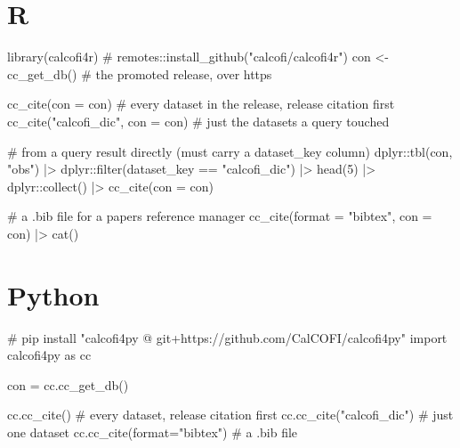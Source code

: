 \documentclass[
  letterpaper,
  DIV=11,
  numbers=noendperiod]{scrreprt}
\newenvironment{Shaded}{\begin{snugshade}}{\end{snugshade}}
\newcommand{\AttributeTok}[1]{\textcolor[rgb]{0.40,0.45,0.13}{#1}}
\newcommand{\BuiltInTok}[1]{\textcolor[rgb]{0.00,0.23,0.31}{#1}}
\newcommand{\CommentTok}[1]{\textcolor[rgb]{0.37,0.37,0.37}{#1}}
\newcommand{\DecValTok}[1]{\textcolor[rgb]{0.68,0.00,0.00}{#1}}
\newcommand{\FunctionTok}[1]{\textcolor[rgb]{0.28,0.35,0.67}{#1}}
\newcommand{\ImportTok}[1]{\textcolor[rgb]{0.00,0.46,0.62}{#1}}
\newcommand{\NormalTok}[1]{\textcolor[rgb]{0.00,0.23,0.31}{#1}}
\newcommand{\OperatorTok}[1]{\textcolor[rgb]{0.37,0.37,0.37}{#1}}
\newcommand{\OtherTok}[1]{\textcolor[rgb]{0.00,0.23,0.31}{#1}}
\newcommand{\SpecialCharTok}[1]{\textcolor[rgb]{0.37,0.37,0.37}{#1}}
\newcommand{\StringTok}[1]{\textcolor[rgb]{0.13,0.47,0.30}{#1}}
\begin{document}
\section{R}

\begin{Shaded}
\begin{Highlighting}[]
\FunctionTok{library}\NormalTok{(calcofi4r)                }\CommentTok{\# remotes::install\_github("calcofi/calcofi4r")}
\NormalTok{con }\OtherTok{\textless{}{-}} \FunctionTok{cc\_get\_db}\NormalTok{()                }\CommentTok{\# the promoted release, over https}

\FunctionTok{cc\_cite}\NormalTok{(}\AttributeTok{con =}\NormalTok{ con)                }\CommentTok{\# every dataset in the release, release citation first}
\FunctionTok{cc\_cite}\NormalTok{(}\StringTok{"calcofi\_dic"}\NormalTok{, }\AttributeTok{con =}\NormalTok{ con) }\CommentTok{\# just the datasets a query touched}

\CommentTok{\# from a query result directly (must carry a dataset\_key column)}
\NormalTok{dplyr}\SpecialCharTok{::}\FunctionTok{tbl}\NormalTok{(con, }\StringTok{"obs"}\NormalTok{) }\SpecialCharTok{|\textgreater{}}
\NormalTok{  dplyr}\SpecialCharTok{::}\FunctionTok{filter}\NormalTok{(dataset\_key }\SpecialCharTok{==} \StringTok{"calcofi\_dic"}\NormalTok{) }\SpecialCharTok{|\textgreater{}}
  \FunctionTok{head}\NormalTok{(}\DecValTok{5}\NormalTok{) }\SpecialCharTok{|\textgreater{}}
\NormalTok{  dplyr}\SpecialCharTok{::}\FunctionTok{collect}\NormalTok{() }\SpecialCharTok{|\textgreater{}}
  \FunctionTok{cc\_cite}\NormalTok{(}\AttributeTok{con =}\NormalTok{ con)}

\CommentTok{\# a .bib file for a paper\textquotesingle{}s reference manager}
\FunctionTok{cc\_cite}\NormalTok{(}\AttributeTok{format =} \StringTok{"bibtex"}\NormalTok{, }\AttributeTok{con =}\NormalTok{ con) }\SpecialCharTok{|\textgreater{}} \FunctionTok{cat}\NormalTok{()}
\end{Highlighting}
\end{Shaded}

\section{Python}

\begin{Shaded}
\begin{Highlighting}[]
\CommentTok{\# pip install "calcofi4py @ git+https://github.com/CalCOFI/calcofi4py"}
\ImportTok{import}\NormalTok{ calcofi4py }\ImportTok{as}\NormalTok{ cc}

\NormalTok{con }\OperatorTok{=}\NormalTok{ cc.cc\_get\_db()}

\NormalTok{cc.cc\_cite()                     }\CommentTok{\# every dataset, release citation first}
\NormalTok{cc.cc\_cite(}\StringTok{"calcofi\_dic"}\NormalTok{)        }\CommentTok{\# just one dataset}
\NormalTok{cc.cc\_cite(}\BuiltInTok{format}\OperatorTok{=}\StringTok{"bibtex"}\NormalTok{)      }\CommentTok{\# a .bib file}
\end{Highlighting}
\end{Shaded}
\end{document}
